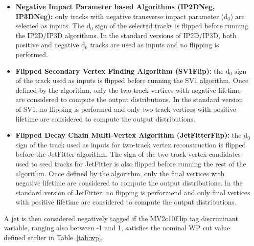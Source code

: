\begin{itemize}

\item \textbf{Negative Impact Parameter based Algorithms (IP2DNeg, IP3DNeg):} only tracks with negative transverse impact parameter (d$_{0}$) are selected as inputs. The d$_{0}$ sign of the selected tracks is flipped before running the IP2D/IP3D algorithms. In the standard versions of IP2D/IP3D, both positive and negative d$_{0}$ tracks are used as inputs and no flipping is performed. 

\item \textbf{Flipped Secondary Vertex Finding Algorithm (SV1Flip):} the d$_{0}$ sign of the track used as inputs is flipped before running the SV1 algorithm. Once defined by the algorithm, only the two-track vertices with negative lifetime are considered to compute the output distributions. In the standard version of SV1, no flipping is performed and only two-track vertices with positive lifetime are considered to compute the output distributions.

\item \textbf{Flipped Decay Chain Multi-Vertex Algorithm (JetFitterFlip):} the d$_{0}$ sign of the track used as inputs for two-track vertex reconstruction is flipped before the JetFitter algorithm. The sign of the two-track vertex candidates used to seed tracks for JetFitter is also flipped before running the rest of the algorithm. Once defined by the algorithm, only the final vertices with negative lifetime are considered to compute the output distributions. In the standard version of JetFitter, no flipping is performend and only final vertices with positive lifetime are considered to compute the output distributions. 

\end{itemize}

A jet is then considered negatively tagged if the MV2c10Flip tag discriminant variable, ranging also between -1 and 1, satisfies the nominal WP cut value defined earlier in Table~\ref{tab:wp}. 
